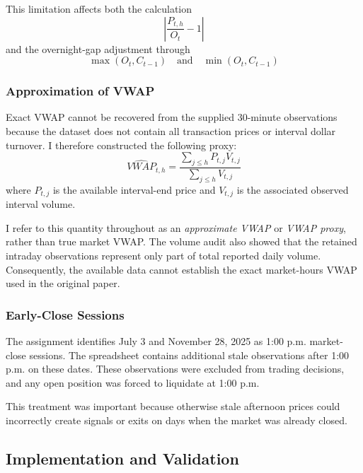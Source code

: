 \documentclass{article}
\begin{document}
This limitation affects both the calculation
\begin{equation}
    \left|
    \frac{P_{t,h}}{O_t}-1
    \right|
\end{equation}
and the overnight-gap adjustment through
\begin{equation}
    \max(O_t,C_{t-1})
    \quad\text{and}\quad
    \min(O_t,C_{t-1})
\end{equation}

\subsubsection{Approximation of VWAP}

Exact VWAP cannot be recovered from the supplied 30-minute observations because the dataset does not contain all transaction prices or interval dollar turnover. I therefore constructed the following proxy:
\begin{equation}
    \widehat{VWAP}_{t,h}
    =
    \frac{
    \sum_{j\leq h}P_{t,j}V_{t,j}
    }{
    \sum_{j\leq h}V_{t,j}
    }
\end{equation}
where $P_{t,j}$ is the available interval-end price and $V_{t,j}$ is the associated observed interval volume.

I refer to this quantity throughout as an \emph{approximate VWAP} or \emph{VWAP proxy}, rather than true market VWAP. The volume audit also showed that the retained intraday observations represent only part of total reported daily volume. Consequently, the available data cannot establish the exact market-hours VWAP used in the original paper.

\subsubsection{Early-Close Sessions}

The assignment identifies July 3 and November 28, 2025 as 1:00 p.m. market-close sessions. The spreadsheet contains additional stale observations after 1:00 p.m. on these dates. These observations were excluded from trading decisions, and any open position was forced to liquidate at 1:00 p.m.

This treatment was important because otherwise stale afternoon prices could incorrectly create signals or exits on days when the market was already closed.

\subsection{Implementation and Validation}
\end{document}
